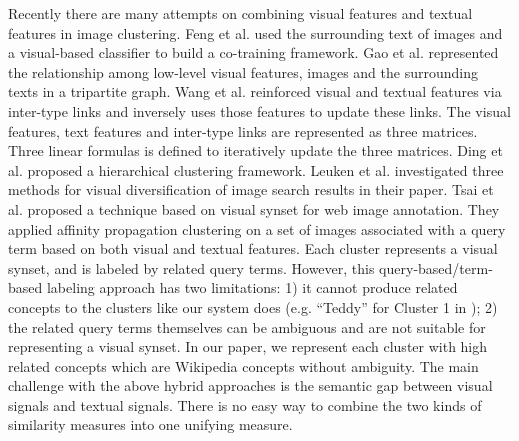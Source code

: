 Recently there are many attempts on combining visual features and textual features in
image clustering. Feng et al.\cite{Feng2004} used the surrounding text of images
and a visual-based classifier to build a co-training framework.
Gao et al.\cite{Gao2005} represented the relationship among low-level visual features,
images and the surrounding texts in a tripartite graph. Wang et al.\cite{WangMZL05}
reinforced visual and textual features via inter-type links and inversely uses those
features to update these links. The visual features, text features and inter-type
links are represented as three matrices. Three linear formulas is defined to iteratively
update the three matrices. Ding et al.\cite{DingLL08} proposed a
hierarchical clustering framework.
Leuken et al.\cite{LeukenPOZ09} investigated three methods for
visual diversification of
image search results in their paper.
Tsai et al.\cite{Tsai11} proposed a technique based on visual synset
for web image annotation.
They applied affinity propagation clustering on a set of images associated
with a query term based on both visual and textual features.
Each cluster represents a visual synset,
and is labeled by related query terms.
However, this query-based/term-based labeling approach has
two limitations: 1) it cannot produce related concepts
to the clusters like our system does
(e.g. ``Teddy'' for Cluster 1 in );
2) the related query terms themselves can be ambiguous and are not suitable
for representing a visual synset.
In our paper, we represent each cluster with high related concepts which are
Wikipedia concepts without ambiguity.
The main challenge with the above hybrid approaches is the
semantic gap between visual signals and textual signals. There is no easy way
to combine the two kinds of similarity measures into one unifying measure.


